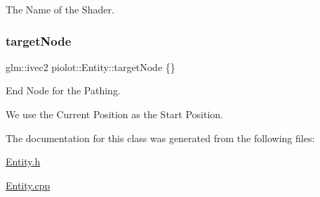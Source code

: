 The Name of the Shader. 

\mbox{\label{classpiolot_1_1_entity_a5038500567bdea17e4c1a4070a7ccef3}} 
\subsubsection{\texorpdfstring{target\+Node}{targetNode}}
{\footnotesize\ttfamily glm\+::ivec2 piolot\+::\+Entity\+::target\+Node \{\}\hspace{0.3cm}{\ttfamily [protected]}}



End Node for the Pathing. 

We use the Current Position as the Start Position. 

The documentation for this class was generated from the following files\+:\begin{DoxyCompactItemize}
\item 
\mbox{\hyperlink{_entity_8h}{Entity.\+h}}\item 
\mbox{\hyperlink{_entity_8cpp}{Entity.\+cpp}}\end{DoxyCompactItemize}

